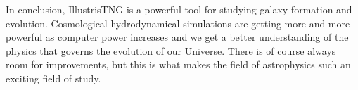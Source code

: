In conclusion, IllustrisTNG is a powerful tool for studying galaxy formation and evolution. Cosmological hydrodynamical simulations are getting more and more powerful as computer power increases and we get a better understanding of the physics that governs the evolution of our Universe. There is of course always room for improvements, but this is what makes the field of astrophysics such an exciting field of study.